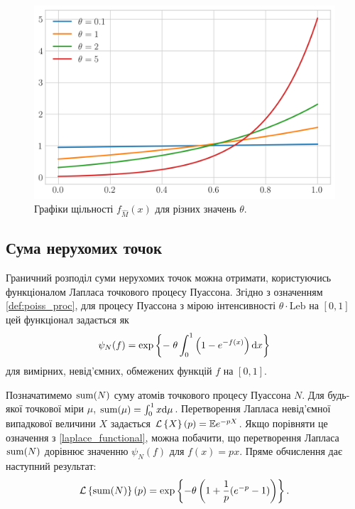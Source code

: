 \begin{theorem}
\begin{figure}[H]
    \end{figure}
    \begin{figure}[H]
        \centering
        \includegraphics[scale=0.65]{plots/pdf_max_hat.png}
        \caption{Графіки щільності $f_{\widehat{M}}(x)$ для різних значень $\theta$.}
    \end{figure}
\end{theorem}

\subsection{Сума нерухомих точок}
Граничний розподіл суми нерухомих точок можна отримати, користуючись функціоналом Лапласа точкового процесу Пуассона.
Згідно з означенням \ref{def:poiss_proc}, для процесу Пуассона з мірою інтенсивності 
$\theta \cdot \mathrm{Leb}$ на $[0, 1]$ цей функціонал задається як
\begin{equation}\label{laplace_functional}
    \psi_N(f) = \exp\left\{ - \; \theta \int_0^1 \left(1 - e^{-f(x)}\right) \mathrm{d} x\right\}
\end{equation}
для вимірних, невід'ємних, обмежених функцій $f$ на $[0, 1]$.

Позначатимемо $\operatorname{sum}(N)$ суму атомів точкового процесу Пуассона $N$. 
Для будь-якої точкової міри $\mu$, 
$\operatorname{sum}(\mu) = \int_0^1 x \mathrm{d}\mu$. 
Перетворення Лапласа невід'ємної випадкової величини $X$ задається
$\mathcal{L}\left\{X\right\}(p) = \mathbb{E} e^{-pX}$. 
Якщо порівняти це означення з \eqref{laplace_functional}, можна побачити, що
перетворення Лапласа $\operatorname{sum}(N)$ дорівнює значенню $\psi_N(f)$ для $f(x) = px$.
Пряме обчислення дає наступний результат:
\begin{gather}\label{laplace_of_sum}
    \mathcal{L}\left\{\operatorname{sum}(N)\right\}(p) = 
    \exp\left\{- \theta \left( 1 + \frac{1}{p}(e^{-p} - 1)\right) \right\}.
\end{gather}

